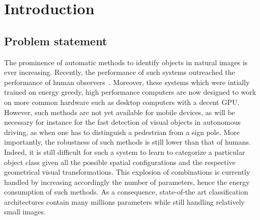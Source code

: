 \section{Introduction}
\label{sec:intro}

\subsection{Problem statement}
The prominence of automatic methods to identify objects in natural images is ever increasing. Recently, the performance of such systems outreached the performance of human observers~\citep{He15}. Moreover, these systems which were intially trained on energy greedy, high performance computers are now designed to work on more common hardware such as desktop computers with a decent GPU. However, such methods are not yet available for mobile devices, as will be necessary for instance for the fast detection of visual objects in autonomous driving, as when one has to distinguish a pedestrian from a sign pole. More importantly, the robustness of such methods is still lower than that of humans. Indeed, it is still difficult for such a system to learn to categorize a particular object class given all the possible spatial configurations and the respective geometrical visual transformations. This explosion of combinations is currently handled by increasing accordingly the number of parameters, hence the energy consumption of such methods. As a consequence, state-of-the art classification architectures contain many millions parameters while still handling relatively small images.

